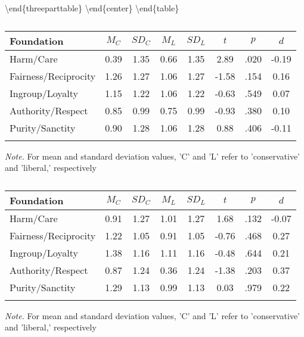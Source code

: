 \documentclass[english,,man]{apa6}
\begin{document}
\textbackslash{}end\{threeparttable\}
\textbackslash{}end\{center\}
\textbackslash{}end\{table\}

\begin{table}[tbp]
\begin{center}
\begin{threeparttable}
\caption{\label{tab:exp2-tablekav}}
\begin{tabular}{lccccccc}
\toprule
Foundation & $M_C$ & $SD_C$ & $M_L$ & $SD_L$ & $t$ & $p$ & $d$\\
\midrule
Harm/Care & 0.39 & 1.35 & 0.66 & 1.35 & 2.89 & .020 & -0.19\\
Fairness/Reciprocity & 1.26 & 1.27 & 1.06 & 1.27 & -1.58 & .154 & 0.16\\
Ingroup/Loyalty & 1.15 & 1.22 & 1.06 & 1.22 & -0.63 & .549 & 0.07\\
Authority/Respect & 0.85 & 0.99 & 0.75 & 0.99 & -0.93 & .380 & 0.10\\
Purity/Sanctity & 0.90 & 1.28 & 1.06 & 1.28 & 0.88 & .406 & -0.11\\
\bottomrule
\addlinespace
\end{tabular}
\begin{tablenotes}[para]
\normalsize{\textit{Note.} For mean and standard deviation values, 'C' and 'L' refer to 'conservative' and 'liberal,' respectively}
\end{tablenotes}
\end{threeparttable}
\end{center}
\end{table}

\begin{table}[tbp]
\begin{center}
\begin{threeparttable}
\caption{\label{tab:exp2-tablegs}}
\begin{tabular}{lccccccc}
\toprule
Foundation & $M_C$ & $SD_C$ & $M_L$ & $SD_L$ & $t$ & $p$ & $d$\\
\midrule
Harm/Care & 0.91 & 1.27 & 1.01 & 1.27 & 1.68 & .132 & -0.07\\
Fairness/Reciprocity & 1.22 & 1.05 & 0.91 & 1.05 & -0.76 & .468 & 0.27\\
Ingroup/Loyalty & 1.38 & 1.16 & 1.11 & 1.16 & -0.48 & .644 & 0.21\\
Authority/Respect & 0.87 & 1.24 & 0.36 & 1.24 & -1.38 & .203 & 0.37\\
Purity/Sanctity & 1.29 & 1.13 & 0.99 & 1.13 & 0.03 & .979 & 0.22\\
\bottomrule
\addlinespace
\end{tabular}
\begin{tablenotes}[para]
\normalsize{\textit{Note.} For mean and standard deviation values, 'C' and 'L' refer to 'conservative' and 'liberal,' respectively}
\end{tablenotes}
\end{threeparttable}
\end{center}
\end{table}
\end{document}
